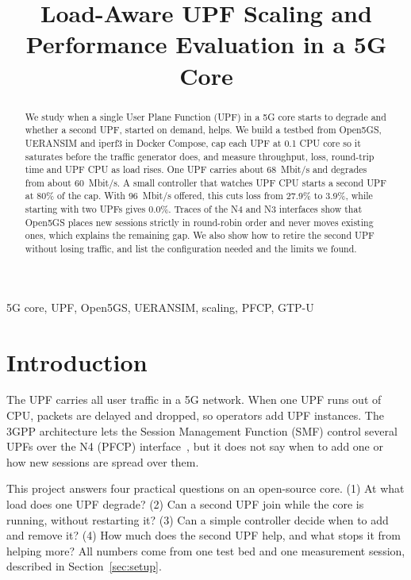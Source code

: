 \documentclass[conference]{IEEEtran}
\begin{document}
\title{Load-Aware UPF Scaling and Performance Evaluation in a 5G Core}

\author{
}

\maketitle

\begin{abstract}
We study when a single User Plane Function (UPF) in a 5G core starts to degrade and whether a second UPF, started on demand, helps. We build a testbed from Open5GS, UERANSIM and iperf3 in Docker Compose, cap each UPF at 0.1 CPU core so it saturates before the traffic generator does, and measure throughput, loss, round-trip time and UPF CPU as load rises. One UPF carries about 68~Mbit/s and degrades from about 60~Mbit/s. A small controller that watches UPF CPU starts a second UPF at 80\% of the cap. With 96~Mbit/s offered, this cuts loss from 27.9\% to 3.9\%, while starting with two UPFs gives 0.0\%. Traces of the N4 and N3 interfaces show that Open5GS places new sessions strictly in round-robin order and never moves existing ones, which explains the remaining gap. We also show how to retire the second UPF without losing traffic, and list the configuration needed and the limits we found.
\end{abstract}

\begin{IEEEkeywords}
5G core, UPF, Open5GS, UERANSIM, scaling, PFCP, GTP-U
\end{IEEEkeywords}

\section{Introduction}
The UPF carries all user traffic in a 5G network. When one UPF runs out of CPU, packets are delayed and dropped, so operators add UPF instances. The 3GPP architecture lets the Session Management Function (SMF) control several UPFs over the N4 (PFCP) interface~\cite{ts23501,ts29244}, but it does not say when to add one or how new sessions are spread over them.

This project answers four practical questions on an open-source core. (1) At what load does one UPF degrade? (2) Can a second UPF join while the core is running, without restarting it? (3) Can a simple controller decide when to add and remove it? (4) How much does the second UPF help, and what stops it from helping more? All numbers come from one test bed and one measurement session, described in Section~\ref{sec:setup}.
\end{document}
